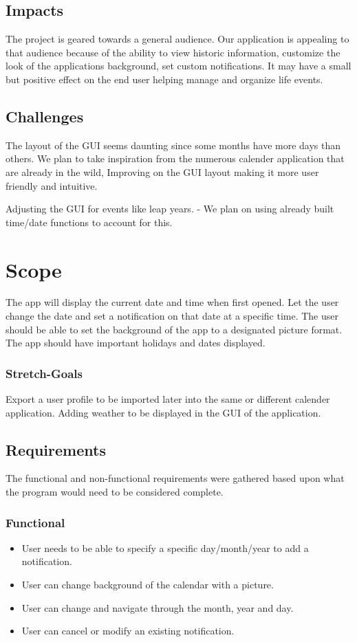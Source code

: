 \documentclass[10pt,conference,onecolumn,compsoc]{IEEEtran}
\begin{document}
\subsection{Impacts}

The project is geared towards a general audience. Our application is appealing to that audience because of the ability to view historic information, customize the look of the applications background, set custom notifications. It may have a small but positive effect on the end user helping manage and organize life events.

\subsection{Challenges}

The layout of the GUI seems daunting since some months have more days than others. We plan to take inspiration from the numerous calender application that are already in the wild, Improving on the GUI layout making it more user friendly and intuitive.

Adjusting the GUI for events like leap years. - We plan on using already built time/date functions to account for this.


\section{Scope}
The app will display the current date and time when first opened. Let the user change the date and set a notification on that date at a specific time. The user should be able to set the background of the app to a designated picture format. The app should have important holidays and dates displayed. 

\subsubsection{Stretch-Goals}
Export a user profile to be imported later into the same or different calender application.
Adding weather to be displayed in the GUI of the application.

\subsection{Requirements}
The functional and non-functional requirements were gathered based upon what the program would need to be considered complete.

\subsubsection{Functional}
\begin{itemize}
\item User needs to be able to specify a specific day/month/year to add a notification.
\item User can change background of the calendar with a picture.
\item User can change and navigate through the month, year and day.
\item User can cancel or modify an existing notification.
\end{itemize}
\end{document}
